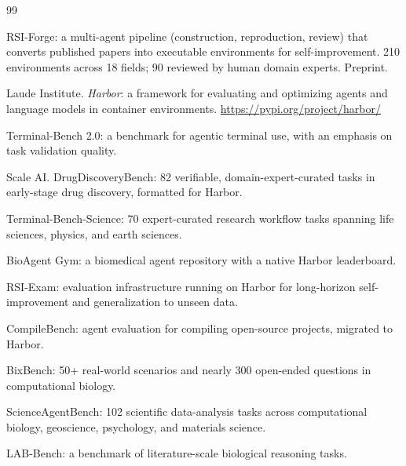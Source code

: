 \begin{thebibliography}{99}

RSI-Forge: a multi-agent pipeline (construction, reproduction, review) that
converts published papers into executable environments for self-improvement.
210 environments across 18 fields; 90 reviewed by human domain experts.
Preprint.

Laude Institute. \emph{Harbor}: a framework for evaluating and optimizing
agents and language models in container environments.
\url{https://pypi.org/project/harbor/}

Terminal-Bench 2.0: a benchmark for agentic terminal use, with an emphasis on
task validation quality.

Scale AI. DrugDiscoveryBench: 82 verifiable, domain-expert-curated tasks in
early-stage drug discovery, formatted for Harbor.

Terminal-Bench-Science: 70 expert-curated research workflow tasks spanning
life sciences, physics, and earth sciences.

BioAgent Gym: a biomedical agent repository with a native Harbor leaderboard.

RSI-Exam: evaluation infrastructure running on Harbor for long-horizon
self-improvement and generalization to unseen data.

CompileBench: agent evaluation for compiling open-source projects, migrated to
Harbor.

BixBench: 50+ real-world scenarios and nearly 300 open-ended questions in
computational biology.

ScienceAgentBench: 102 scientific data-analysis tasks across computational
biology, geoscience, psychology, and materials science.

LAB-Bench: a benchmark of literature-scale biological reasoning tasks.


\end{thebibliography}
